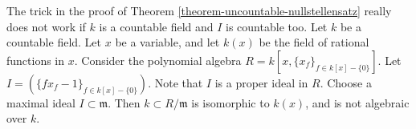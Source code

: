\begin{example}
\label{example-countable-trick-does-not-work}
The trick in the proof of
Theorem \ref{theorem-uncountable-nullstellensatz}
really does not work if $k$ is a countable field and $I$ is countable too.
Let $k$ be a countable field. Let $x$ be a variable,
and let $k(x)$ be the field of rational functions in $x$.
Consider the polynomial algebra $R = k[x, \{x_f\}_{f \in k[x]-\{0\}}]$.
Let $I = (\{fx_f - 1\}_{f\in k[x] - \{0\}})$. Note that
$I$ is a proper ideal in $R$.
Choose a maximal ideal $I \subset \mathfrak m$.
Then $k \subset R/\mathfrak m$ is isomorphic to
$k(x)$, and is not algebraic over $k$.
\end{example}